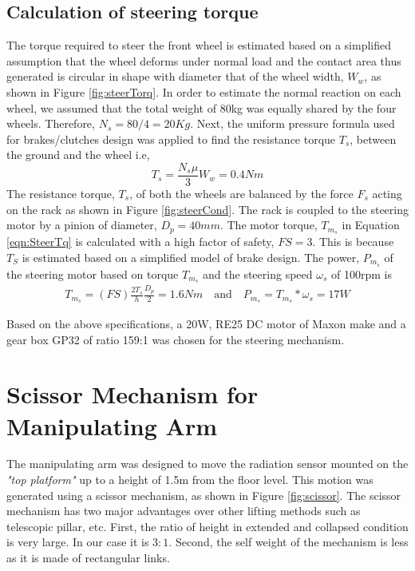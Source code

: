 \subsection{Calculation of steering torque}
The torque required to steer the front wheel is estimated based on a simplified assumption that the wheel deforms under normal load and the contact area thus generated is  circular in shape with diameter that of the wheel width, $W_w$, as shown in Figure \ref{fig:steerTorq}. 
In order to estimate the normal reaction on each wheel, we assumed that the total weight of 80kg was equally shared by the four wheels. 
Therefore, $N_s=80/4=20Kg$. Next, the uniform pressure formula used for  brakes/clutches design was applied to find the resistance  torque $T_s$, between the ground and the wheel i.e, 
\begin{equation}
\label{eqn:brake}
T_s=\frac{N_s\mu}{3}W_w= 0.4Nm
\end{equation}  
The resistance torque, $T_s$, of  both the wheels  are balanced by the force $F_s$ acting on the rack as shown in Figure \ref{fig:steerCond}. The rack is coupled to the steering motor by a pinion of diameter, $D_p=40mm$. The motor  torque, $T_{m_s}$  in Equation  \ref{eqn:SteerTq} is calculated with a  high factor of safety, $FS=3$. This is because $T_S$ is estimated  based on a simplified model of brake design. The power, $P_{m_s}$ of the steering motor based on  torque $T_{m_s}$ and the steering speed $\omega_s$ of 100rpm is 
\begin{equation}
\begin{aligned}
\label{eqn:SteerTq}
T_{m_s}=(FS)\frac{2T_s}{h}\frac{D_p}{2}=1.6Nm \quad \text{and}\quad P_{m_s}=T_{m_s}*\omega_s=17W
\end{aligned}
\end{equation} 

Based on the above specifications, a 20W, RE25 DC motor of Maxon  make and a gear box  GP32 of ratio 159:1 was chosen for the steering mechanism. 
 
\section{Scissor Mechanism for Manipulating Arm}
 The manipulating arm  was designed to move  the radiation sensor mounted on the \textit{"top platform"} up to a height of 1.5m from the floor level. This motion was generated using  a scissor mechanism, as shown in Figure \ref{fig:scissor}. The scissor mechanism has two major advantages over other lifting methods such as telescopic pillar, etc.  First, the  ratio of height in extended and collapsed condition is very large. In our case it is $3:1$. Second, the self weight of the mechanism is less as it is made of rectangular links.

